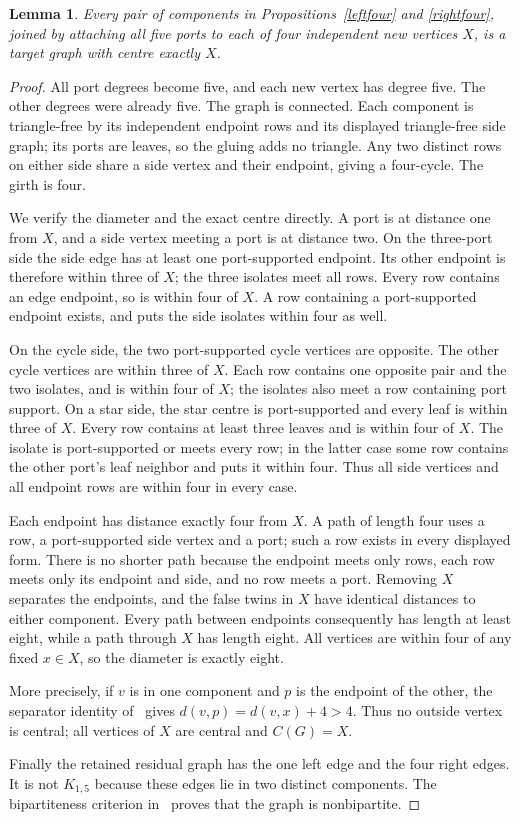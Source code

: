 \documentclass[11pt]{article}
\newtheorem{lemma}[theorem]{Lemma}
\begin{document}
\begin{lemma}\label{fourconverse}
Every pair of components in Propositions~\ref{leftfour} and
\ref{rightfour}, joined by attaching all five ports to each of four
independent new vertices $X$, is a target graph with centre exactly $X$.
\end{lemma}
\begin{proof}
All port degrees become five, and each new vertex has degree five.
The other degrees were already five. The graph is connected. Each
component is triangle-free by its independent endpoint rows and its
displayed triangle-free side graph; its ports are leaves, so the gluing
adds no triangle. Any two distinct rows on either side share a side
vertex and their endpoint, giving a four-cycle. The girth is four.

We verify the diameter and the exact centre directly. A port is at
distance one from $X$, and a side vertex meeting a port is at distance
two. On the three-port side the side edge has at least one port-supported
endpoint. Its other endpoint is therefore within three of $X$; the
three isolates meet all rows. Every row contains an edge endpoint,
so is within four of $X$. A row containing a port-supported endpoint
exists, and puts the side isolates within four as well.

On the cycle side, the two port-supported cycle vertices are opposite.
The other cycle vertices are within three of $X$. Each row contains
one opposite pair and the two isolates, and is within four of $X$;
the isolates also meet a row containing port support. On a star side,
the star centre is port-supported and every leaf is within three of
$X$. Every row contains at least three leaves and is within four of
$X$. The isolate is port-supported or meets every row; in the latter
case some row contains the other port's leaf neighbor and puts it
within four. Thus all side vertices and all endpoint rows are within
four in every case.

Each endpoint has distance exactly four from $X$. A path of length
four uses a row, a port-supported side vertex and a port; such a row
exists in every displayed form. There is no shorter path because the
endpoint meets only rows, each row meets only its endpoint and side,
and no row meets a port. Removing $X$ separates the endpoints, and
the false twins in $X$ have identical distances to either component.
Every path between endpoints consequently has length at least eight,
while a path through $X$ has length eight. All vertices are within four
of any fixed $x\in X$, so the diameter is exactly eight.

More precisely, if $v$ is in one component and $p$ is the endpoint of
the other, the separator identity of~\cite{middle} gives
$d(v,p)=d(v,x)+4>4$. Thus no outside vertex is central; all vertices
of $X$ are central and $C(G)=X$.

Finally the retained residual graph has the one left edge and the four
right edges. It is not $K_{1,5}$ because these edges lie in two distinct
components. The bipartiteness criterion in~\cite{rows} proves that the
graph is nonbipartite.
\end{proof}
\end{document}

